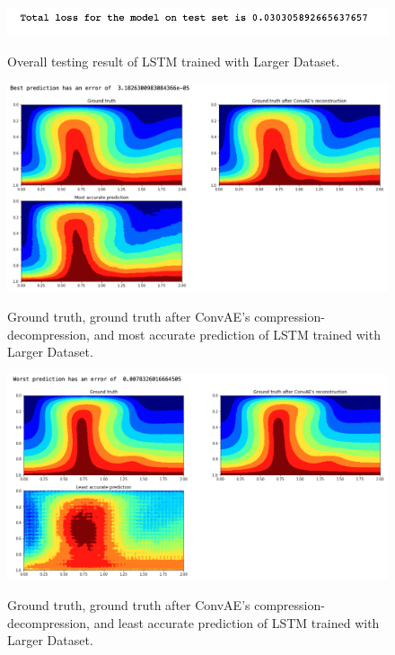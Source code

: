 \begin{figure}[H]
    \caption{Overall testing result of LSTM trained with Larger Dataset.}
    \includegraphics[scale=0.8]{figures/mantle_convection_images/larger_dataset/LSTM_OverallTesting.png}
    \label{figure:LSTM_larger_testing}
\end{figure}

\begin{figure}[H]
    \caption{Ground truth, ground truth after ConvAE's compression-decompression, and most accurate prediction of LSTM trained with Larger Dataset.}
    \includegraphics[scale=0.5]{figures/mantle_convection_images/larger_dataset/LSTM_Best.png}
    \label{figure:LSTM_larger_best}
\end{figure}

\begin{figure}[H]
    \caption{Ground truth, ground truth after ConvAE's compression-decompression, and least accurate prediction of LSTM trained with Larger Dataset.}
    \includegraphics[scale=0.5]{figures/mantle_convection_images/larger_dataset/LSTM_Worst.png}
    \label{figure:LSTM_larger_worst}
\end{figure}


